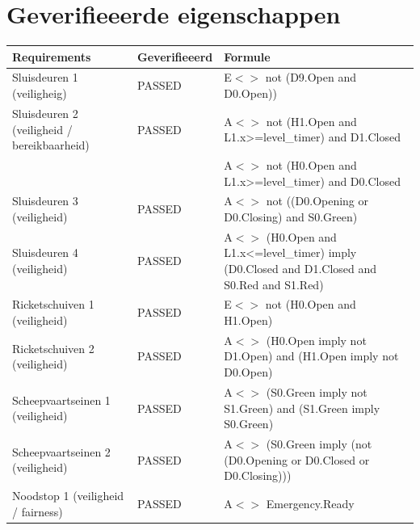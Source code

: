 \documentclass{article}
\begin{document}
\section {Geverifieeerde eigenschappen}
    \centering
    \begin{tabular}{ |p{4cm}||p{2cm}|p{7cm}|}
        \hline
            Requirements & Geverifieeerd & Formule \\
        \hline
        \hline
            Sluisdeuren 1 (veiligheig)                      &           \leavevmode\color[HTML]{32CD32} PASSED          &         E$<>$ not (D9.Open and D0.Open))        \\ \hline
            Sluisdeuren 2 (veiligheid / bereikbaarheid)     &           \leavevmode\color[HTML]{32CD32} PASSED          &         A$<>$ not (H1.Open and L1.x>=level\_timer) and D1.Closed \\ 
            &&A$<>$ not (H0.Open and L1.x>=level\_timer) and D0.Closed       \\ \hline
            Sluisdeuren 3 (veiligheid)                      &           \leavevmode\color[HTML]{32CD32} PASSED          &         A$<>$ not ((D0.Opening or D0.Closing) and S0.Green)        \\ \hline
            Sluisdeuren 4 (veiligheid)                      &           \leavevmode\color[HTML]{32CD32} PASSED          &         A$<>$ (H0.Open and L1.x<=level\_timer) imply (D0.Closed and D1.Closed and S0.Red and S1.Red)        \\ \hline
            Ricketschuiven 1 (veiligheid)                   &           \leavevmode\color[HTML]{32CD32} PASSED          &         E$<>$ not (H0.Open and H1.Open)        \\ \hline
            Ricketschuiven 2 (veiligheid)                   &           \leavevmode\color[HTML]{32CD32} PASSED          &         A$<>$ (H0.Open imply not D1.Open) and (H1.Open imply not D0.Open)        \\ \hline
            Scheepvaartseinen 1 (veiligheid)                &           \leavevmode\color[HTML]{32CD32} PASSED          &         A$<>$ (S0.Green imply not S1.Green) and (S1.Green imply S0.Green)        \\ \hline
            Scheepvaartseinen 2 (veiligheid)                &           \leavevmode\color[HTML]{32CD32} PASSED          &         A$<>$ (S0.Green imply (not (D0.Opening or D0.Closed or D0.Closing)))        \\ \hline
            Noodstop 1 (veiligheid / fairness)              &           \leavevmode\color[HTML]{32CD32} PASSED          &         A$<>$ Emergency.Ready        \\ \hline

\end{tabular}
\end{document}
